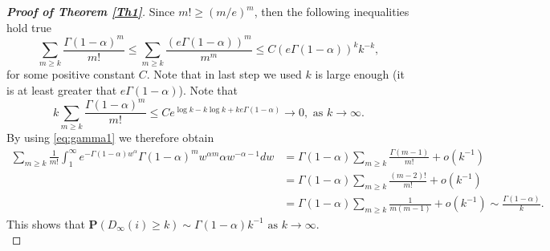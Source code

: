 \documentclass[11pt, reqno]{amsart}
\numberwithin{equation}{section}
\renewcommand{\o}[1]{o\left(#1\right)}
\theoremstyle{plain} %
\theoremstyle{definition} %
\newcommand{\prob}{\mathbf{P}}
\begin{document}
\begin{proof}[{\bf Proof of Theorem \ref{Th1}}]
Since $m! \ge (m/e)^m$, then the following inequalities hold true
$$\sum_{m\ge k} \frac{\Gamma(1-\alpha)^m}{m!} \le \sum_{m\ge k} \frac{(e\Gamma(1-\alpha))^m}{m^m}\le C(e\Gamma(1-\alpha))^k k^{-k},$$
for some positive constant $C$. Note that in last step we used $k$ is large enough (it is at least greater that $e\Gamma(1-\alpha)$). Note that
$$k\sum_{m\ge k} \frac{\Gamma(1-\alpha)^m}{m!} \le C e^{\log k- k\log k+k e\Gamma(1-\alpha)}\to 0, \text{ as $k\to \infty$}.$$
By using \eqref{eq:gamma1} we therefore obtain
\begin{align*}
\sum_{m\ge k}\frac{1}{m!}\int_1^{\infty}  e^{-\Gamma(1-\alpha) w^\alpha}\Gamma(1-\alpha)^{m}w^{\alpha m}\alpha w^{-\alpha-1}dw &= \Gamma(1-\alpha) \sum_{m\ge k} \frac{\Gamma(m-1)}{m!}+ \o{k^{-1}}\\
&= \Gamma(1-\alpha) \sum_{m\ge k} \frac{ (m-2)!}{m!}+\o{k^{-1}}\\
&= \Gamma(1-\alpha) \sum_{m\ge k} \frac{1}{m(m-1)}+\o{k^{-1}}\sim \frac{\Gamma(1-\alpha)}{k}. \end{align*}
This shows that $\prob( D_\infty(i)\ge k) \sim  \Gamma(1-\alpha) k^{-1}\text{ as $k\to\infty$}$.\\



\end{proof}
\end{document}
